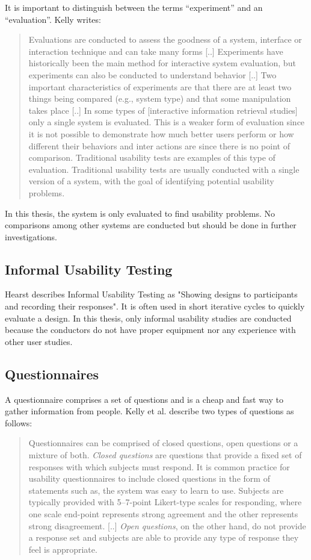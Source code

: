 \documentclass[11pt]{report}
\begin{document}
It is important to distinguish between the terms ``experiment'' and an ``evaluation''. Kelly \cite{Kelly2007} writes:
\begin{quote}
Evaluations are conducted to assess the goodness of a system, interface or interaction technique and can take many forms [..] Experiments have historically been the main method for interactive system evaluation, but experiments can also be conducted to understand behavior [..] Two important characteristics of experiments are that there are at least two things being compared (e.g., system type) and that some manipulation takes place [..] In some types of [interactive information retrieval studies] only a single system is evaluated. This is a weaker form of evaluation since it is not possible to demonstrate how much better users perform or how different their behaviors and inter actions are since there is no point of comparison. Traditional usability tests are examples of this type of evaluation. Traditional usability tests are usually conducted with a single version of a system, with the goal of identifying potential usability problems.	
\end{quote}

In this thesis, the system is only evaluated to find usability problems. No comparisons among other systems are conducted but should be done in further investigations.

\subsection{Informal Usability Testing}

Hearst \cite{Hearst2009} describes Informal Usability Testing as "Showing designs to participants and recording their responses". It is often used in short iterative cycles to quickly evaluate a design. In this thesis, only informal usability studies are conducted because the conductors do not have proper equipment nor any experience with other user studies.

\subsection{Questionnaires}

A questionnaire comprises a set of questions and is a cheap and fast way to gather information from people. Kelly et al. \cite{Kelly2008} describe two types of questions as follows:

\begin{quote}
	Questionnaires can be comprised of closed questions, open questions or a mixture of both. \textit{Closed questions} are questions that provide a fixed set of responses with which subjects must respond. It is common practice for usability questionnaires to include closed questions in the form of statements such as, the system was easy to learn to use. Subjects are typically provided with 5–7-point Likert-type scales for responding, where one scale end-point represents strong agreement and the other represents strong disagreement. [..] \textit{Open questions}, on the other hand, do not provide a response set and subjects are able to provide any type of response they feel is appropriate. 
	\end{quote}
\end{document}
